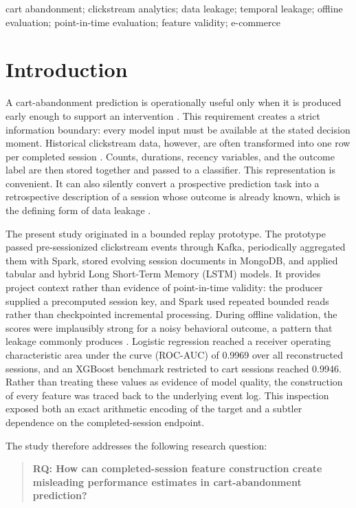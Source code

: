 \documentclass[conference, letterpaper]{IEEEtran}
\begin{document}
\begin{IEEEkeywords}
cart abandonment; clickstream analytics; data leakage; temporal leakage; offline evaluation; point-in-time evaluation; feature validity; e-commerce
\end{IEEEkeywords}

\section{Introduction}
A cart-abandonment prediction is operationally useful only when it is produced early enough to support an intervention \cite{esmeli2021,requena2020}. This requirement creates a strict information boundary: every model input must be available at the stated decision moment. Historical clickstream data, however, are often transformed into one row per completed session \cite{sakar2019,rausch2022,waldmann2025}. Counts, durations, recency variables, and the outcome label are then stored together and passed to a classifier. This representation is convenient. It can also silently convert a prospective prediction task into a retrospective description of a session whose outcome is already known, which is the defining form of data leakage \cite{kaufman2012}.

The present study originated in a bounded replay prototype. The prototype passed pre-sessionized clickstream events through Kafka, periodically aggregated them with Spark, stored evolving session documents in MongoDB, and applied tabular and hybrid Long Short-Term Memory (LSTM) models. It provides project context rather than evidence of point-in-time validity: the producer supplied a precomputed session key, and Spark used repeated bounded reads rather than checkpointed incremental processing. During offline validation, the scores were implausibly strong for a noisy behavioral outcome, a pattern that leakage commonly produces \cite{kapoor2023}. Logistic regression reached a receiver operating characteristic area under the curve (ROC-AUC) of 0.9969 over all reconstructed sessions, and an XGBoost benchmark restricted to cart sessions reached 0.9946. Rather than treating these values as evidence of model quality, the construction of every feature was traced back to the underlying event log. This inspection exposed both an exact arithmetic encoding of the target and a subtler dependence on the completed-session endpoint.

The study therefore addresses the following research question:
\begin{quote}
\textbf{RQ: How can completed-session feature construction create misleading performance estimates in cart-abandonment prediction?}
\end{quote}
\end{document}
